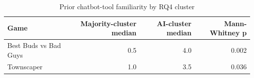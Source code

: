 \begin{table}[t]
\centering
\caption{Prior chatbot-tool familiarity by RQ4 cluster}
\label{tab:rq13-chatbot-experience}
\begin{tabular}{lrrr}
\toprule
Game & Majority-cluster median & AI-cluster median & Mann-Whitney p \\
\midrule
Best Buds vs Bad Guys & 0.5 & 4.0 & 0.002 \\
Townscaper & 1.0 & 3.5 & 0.036 \\
\bottomrule
\end{tabular}
\end{table}
